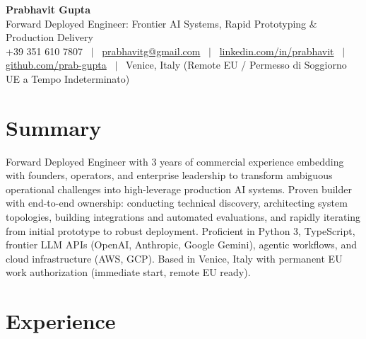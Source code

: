 \documentclass[a4paper,10pt]{article}
\begin{document}
\begin{minipage}[c]{0.80\textwidth}
  {\Huge\bfseries Prabhavit Gupta}\\[3pt]
  {\color{accent}\large Forward Deployed Engineer: Frontier AI Systems, Rapid Prototyping \& Production Delivery}\\[6pt]
  {\footnotesize +39 351 610 7807 ~$\vert$~
  \href{mailto:prabhavitg@gmail.com}{prabhavitg@gmail.com} ~$\vert$~
  \href{https://www.linkedin.com/in/prabhavit/}{linkedin.com/in/prabhavit} ~$\vert$~
  \href{https://github.com/prab-gupta}{github.com/prab-gupta} ~$\vert$~
  Venice, Italy (Remote EU / Permesso di Soggiorno UE a Tempo Indeterminato)}
\end{minipage}\hfill

\section{Summary}
Forward Deployed Engineer with 3 years of commercial experience embedding with founders, operators, and enterprise leadership to transform ambiguous operational challenges into high-leverage production AI systems. Proven builder with end-to-end ownership: conducting technical discovery, architecting system topologies, building integrations and automated evaluations, and rapidly iterating from initial prototype to robust deployment. Proficient in Python 3, TypeScript, frontier LLM APIs (OpenAI, Anthropic, Google Gemini), agentic workflows, and cloud infrastructure (AWS, GCP). Based in Venice, Italy with permanent EU work authorization (immediate start, remote EU ready).

\section{Experience}
\end{document}

